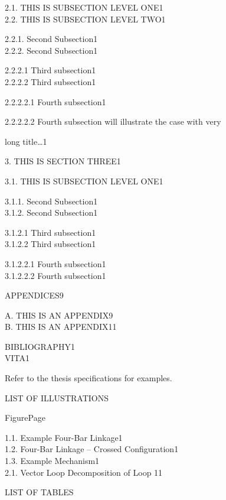 \documentclass{article}
\newcommand{\tab}{\hspace{5mm}}
\begin{document}
2.1. THIS IS SUBSECTION LEVEL ONE\tab 1\\
2.2. THIS IS SUBSECTION LEVEL TWO\tab 1


2.2.1. Second Subsection\tab 1\\
2.2.2. Second Subsection\tab 1


2.2.2.1 Third subsection\tab 1\\
2.2.2.2 Third subsection\tab 1


2.2.2.2.1 Fourth subsection\tab 1


2.2.2.2.2 Fourth subsection will illustrate the case with very 


\tab long title\dots \tab 1


3. THIS IS SECTION THREE\tab 1


3.1. THIS IS SUBSECTION LEVEL ONE\tab 1


3.1.1. Second Subsection\tab 1\\
3.1.2. Second Subsection\tab 1


3.1.2.1 Third subsection\tab 1\\
3.1.2.2 Third subsection\tab 1


3.1.2.2.1 Fourth subsection\tab 1\\
3.1.2.2.2 Fourth subsection\tab 1


APPENDICES\tab 9


A. THIS IS AN APPENDIX\tab 9\\
B. THIS IS AN APPENDIX\tab 11


BIBLIOGRAPHY\tab 1\\
VITA\tab \tab 1



Refer to the thesis specifications for examples.




\newpage

\begin{center}
LIST OF ILLUSTRATIONS


\end{center}

Figure\tab \tab \tab \tab \tab \tab \tab \tab \tab \tab \tab  Page


1.1. Example Four-Bar Linkage\tab 1\\
1.2. Four-Bar Linkage -- Crossed Configuration\tab 1\\
1.3. Example Mechanism\tab 1\\
2.1. Vector Loop Decomposition of Loop 1\tab 1



\newpage

\begin{center}
LIST OF TABLES


\end{center}
\end{document}
